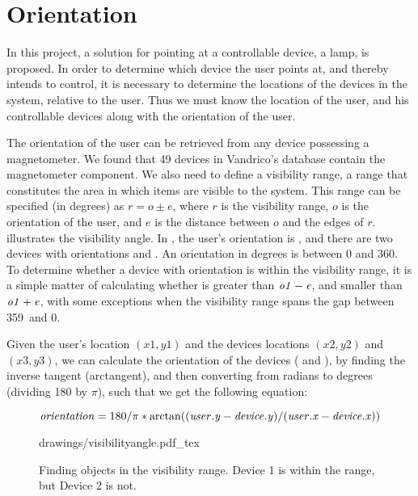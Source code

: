 \section{Orientation}\label{sec:analysis:orientation}
In this project, a solution for pointing at a controllable device, \eg a lamp, is proposed. 
In order to determine which device the user points at, 
and thereby intends to control, 
it is necessary to determine the locations of the devices in the system, 
relative to the user. 
Thus we must know the location of the user, 
and his controllable devices along with the orientation of the user.

The orientation of the user can be retrieved from any device possessing a magnetometer. 
We found that \num{49} devices in Vandrico's database contain the magnetometer component. 
We also need to define a visibility range, 
\ie a range that constitutes the area in which items are visible to the system. 
This range can be specified (in degrees) as $r = o \pm e$, 
where $r$ is the visibility range, $o$ is the orientation of the user, 
and $e$ is the distance between $o$ and the edges of $r$.
 illustrates the visibility angle. 
In , the user's orientation is , 
and there are two devices with orientations  and . 
An orientation in degrees is between \num{0} and \num{360}. 
To determine whether a device with orientation  is within the visibility range, 
it is a simple matter of calculating whether  is greater than $\var{o1}-\var{e}$, 
and smaller than $\var{o1}+\var{e}$, 
with some exceptions when the visibility range spans the gap between 359\degree \ and 0\degree.

Given the user's location $(x1, y1)$ and the devices locations $(x2, y2)$ and $(x3, y3)$,
we can calculate the orientation of the devices ( and ), 
by finding the inverse tangent (arctangent), 
and then converting from radians to degrees (dividing \num{180} by $\pi$), 
such that we get the following equation:

\begin{equation}\label{eq:angle}
\var{orientation} = 180 / \pi * \arctan((\var{user.y} - \var{device.y}) / (\var{user.x} - \var{device.x}))
\end{equation}

\begin{figure}[!htb]
    \centering
    \def\svgwidth{0.6\textwidth}
    {drawings/visibilityangle.pdf_tex}
    \caption{Finding objects in the visibility range. Device 1 is within the range, but Device 2 is not.}
\label{fig:visibilityangle}
\end{figure}


